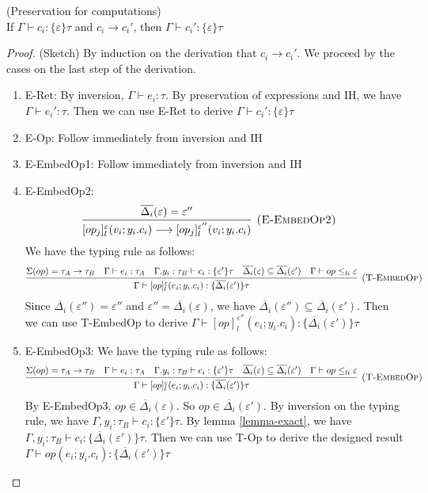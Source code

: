 \begin{lemma} (Preservation for computations) \\
If $\Gamma \vdash c_i : \{\varepsilon\} \tau$ and $c_i \longrightarrow c_i'$, then $\Gamma \vdash c_i' : \{\varepsilon\}\tau$

\begin{proof} (Sketch)
By induction on the derivation that $c_i \longrightarrow c_i'$. We proceed by the cases on the last step of the derivation.

\begin{enumerate}
\item E-Ret: By inversion, $\Gamma \vdash e_i: \tau$. By preservation of expressions and IH, we have  $\Gamma \vdash e_i': \tau$. Then we can use E-Ret to derive $\Gamma  \vdash c_i' : \{\varepsilon\} \tau$
\item E-Op: Follow immediately from inversion and IH
\item E-EmbedOp1: Follow immediately from inversion and IH
\item E-EmbedOp2:  
$$\infer[\textsc{(E-EmbedOp2)}]
{[op_j]^\varepsilon_l(v_i; y_i.c_i) \longrightarrow [op_j]^{\varepsilon''}_l(v_i; y_i.c_i) }
{\overline{\Delta_i}(\varepsilon) = \varepsilon''} \quad $$
We have the typing rule as follows:
$$\infer[\textsc{(T-EmbedOp)}]
  {\Gamma\vdash [op]^\varepsilon_l(e_i; y_i.c_i) : \{\overline{\Delta_i}(\varepsilon')\}\tau }
  {\Sigma(op) = \tau_A \rightarrow \tau_B & \Gamma \vdash e_i : \tau_A & \Gamma. y_i:\tau_B\vdash c_i: \{\varepsilon'\}\tau & \overline{\Delta_i}(\varepsilon) \subseteq \overline{\Delta_i}(\varepsilon') & \Gamma \vdash op \leq_{li} \varepsilon}  $$
  Since $\overline{\Delta_i}(\varepsilon'') = \varepsilon''$ and $\varepsilon'' = \overline{\Delta_i}(\varepsilon)$, we have $\overline{\Delta_i}(\varepsilon'')  \subseteq \overline{\Delta_i}(\varepsilon')$. Then we can use T-EmbedOp to derive $\Gamma\vdash [op]^{\varepsilon''}_l(e_i; y_i.c_i) : \{\overline{\Delta_i}(\varepsilon')\}\tau $
\item E-EmbedOp3:
  We have the typing rule as follows:
$$\infer[\textsc{(T-EmbedOp)}]
  {\Gamma\vdash [op]^\varepsilon_l(e_i; y_i.c_i) : \{\overline{\Delta_i}(\varepsilon')\}\tau }
  {\Sigma(op) = \tau_A \rightarrow \tau_B & \Gamma \vdash e_i : \tau_A & \Gamma. y_i:\tau_B\vdash c_i: \{\varepsilon'\}\tau & \overline{\Delta_i}(\varepsilon) \subseteq \overline{\Delta_i}(\varepsilon') & \Gamma \vdash op \leq_{li} \varepsilon}  $$
  By E-EmbedOp3, $op \in \overline{\Delta_i}(\varepsilon)$. So $op \in \overline{\Delta_i}(\varepsilon')$. 
By inversion on the typing rule, we have $\Gamma, y_i:\tau_B\vdash c_i: \{\varepsilon'\}\tau$. By lemma \ref{lemma-exact}, we have $\Gamma, y_i:\tau_B\vdash c_i: \{\overline{\Delta_i}(\varepsilon')\}\tau$. Then we can use T-Op to derive the designed result $\Gamma \vdash op(e_i; y_i.c_i) : \{\overline{\Delta_i}(\varepsilon')\}\tau $


\end{enumerate}
\end{proof}
\end{lemma}
